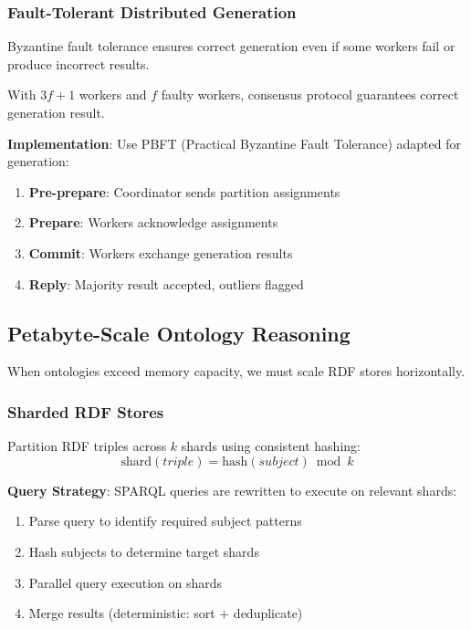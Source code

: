 \subsubsection{Fault-Tolerant Distributed Generation}

Byzantine fault tolerance ensures correct generation even if some workers fail or produce incorrect results.

\begin{theorem}
    With $3f+1$ workers and $f$ faulty workers, consensus protocol guarantees correct generation result.
\end{theorem}

\textbf{Implementation}: Use PBFT (Practical Byzantine Fault Tolerance) adapted for generation:
\begin{enumerate}
    \item \textbf{Pre-prepare}: Coordinator sends partition assignments
    \item \textbf{Prepare}: Workers acknowledge assignments
    \item \textbf{Commit}: Workers exchange generation results
    \item \textbf{Reply}: Majority result accepted, outliers flagged
\end{enumerate}

\subsection{Petabyte-Scale Ontology Reasoning}

When ontologies exceed memory capacity, we must scale RDF stores horizontally.

\subsubsection{Sharded RDF Stores}

\begin{definition}
    Partition RDF triples across $k$ shards using consistent hashing:
    \begin{equation}
        \text{shard}(triple) = \text{hash}(subject) \bmod k
    \end{equation}
\end{definition}

\textbf{Query Strategy}: SPARQL queries are rewritten to execute on relevant shards:
\begin{enumerate}
    \item Parse query to identify required subject patterns
    \item Hash subjects to determine target shards
    \item Parallel query execution on shards
    \item Merge results (deterministic: sort + deduplicate)
\end{enumerate}

